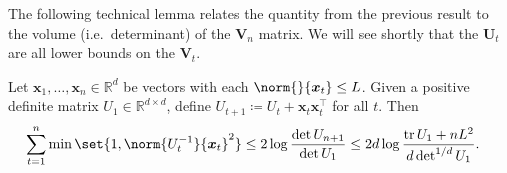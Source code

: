 \documentclass{article}
\renewcommand{\vec}[1]{\bm{#1}}
\newcommand{\defeq}{\coloneq}
\newcommand{\inv}[1]{#1^{-1}}
\newcommand{\Real}{\mathds{R}}
\newcommand{\tr}{\operatorname{tr}}
\renewcommand{\det}{\operatorname{det}}
\providecommand\transp{\top}
\let\transpsymbol\transp
\renewcommand{\transp}[1]{#1^\transpsymbol}
\begin{document}
The following technical lemma relates the quantity from the previous
result to the volume (i.e.\ determinant) of the $\vec V_n$ matrix.
We will see shortly that the $\vec U_t$ are all lower bounds on the
$\vec V_t$.

\begin{lemma}\label{lemma:elliptical-potential}
  Let $\vec x_1,\dotsc,\vec x_n \in \Real^d$ be vectors with each
  $\norm{}{\vec x_t} \le L$.  Given a positive definite matrix
  $U_1\in\Real^{d\times d}$, define
  $U_{t+1} \defeq U_t + \vec x_t \transp{\vec x_t}$ for all $t$.  Then
  \begin{align*}
    \sum_{t=1}^n\min\set{1, \norm{\inv{U_t}}{\vec x_t}^2}
    &\le 2\log\frac{\det U_{n+1}}{\det U_1}
      \le 2d\log\frac{\tr U_1+nL^2}{d\det^{1/d} U_1}.
  \end{align*}
\end{lemma}
\end{document}
